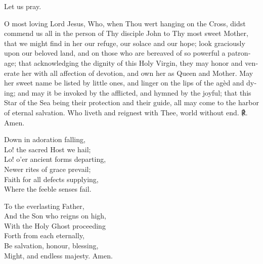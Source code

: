 \documentclass[11pt]{article}
\begin{document}
\begin{otherlanguage}{english}
Let us pray.

\lettrine{O}{} most loving Lord Jesus, Who, when Thou wert hanging on the Cross, didst commend us all in the person of Thy disciple John to Thy most sweet Mother, that we might find in her our refuge, our solace and our hope; look graciously upon our beloved land, and on those who are bereaved of so powerful a patronage; that acknowledging the dignity of this Holy Virgin, they may honor and venerate her with all affection of devotion, and own her as Queen and Mother. May her sweet name be listed by little ones, and linger on the lips of the agèd and dying; and may it be invoked by the afflicted, and hymned by the joyful; that this Star of the Sea being their protection and their guide, all may come to the harbor of eternal salvation. Who liveth and reignest with Thee, world without end. ℟. Amen.


\end{otherlanguage}

\begin{multicols}{2}
\raggedcolumns
\begin{otherlanguage}{english}
Down in adoration falling,\\
Lo! the sacred Host we hail;\\
Lo! o'er ancient forms departing,\\
Newer rites of grace prevail;\\
Faith for all defects supplying,\\
Where the feeble senses fail.

To the everlasting Father,\\
And the Son who reigns on high,\\
With the Holy Ghost proceeding\\
Forth from each eternally,\\
Be salvation, honour, blessing,\\
Might, and endless majesty.
Amen.
\end{otherlanguage}
\end{multicols}
\end{document}
